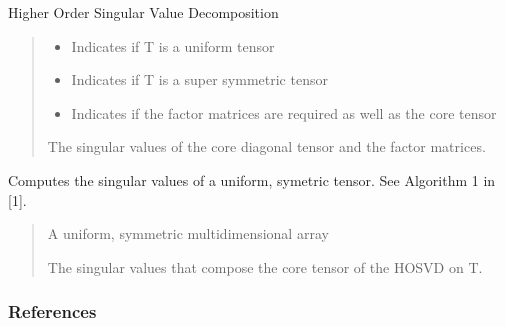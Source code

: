 \documentclass[letterpaper,10pt,english]{sphinxmanual}
\begin{document}
\begin{fulllineitems}
\label{\detokenize{HAT:HAT.multilinalg.hosvd}}
\pysigstartsignatures
{}
\pysigstopsignatures
\sphinxAtStartPar
Higher Order Singular Value Decomposition
\begin{quote}\begin{description}
\begin{itemize}
\item {} 
\sphinxAtStartPar
{} \textendash{} Indicates if T is a uniform tensor

\item {} 
\sphinxAtStartPar
{} \textendash{} Indicates if T is a super symmetric tensor

\item {} 
\sphinxAtStartPar
{} \textendash{} Indicates if the factor matrices are required as well as the core tensor

\end{itemize}

\sphinxAtStartPar
The singular values of the core diagonal tensor and the factor matrices.

\end{description}\end{quote}

\end{fulllineitems}


\begin{fulllineitems}
\label{\detokenize{HAT:HAT.multilinalg.supersymHosvd}}
\pysigstartsignatures
{}
\pysigstopsignatures
\sphinxAtStartPar
Computes the singular values of a uniform, symetric tensor. See Algorithm 1 in {[}1{]}.
\begin{quote}\begin{description}
\sphinxAtStartPar
{} \textendash{} A uniform, symmetric multidimensional array

\sphinxAtStartPar
The singular values that compose the core tensor of the HOSVD on T.

\end{description}\end{quote}
\subsubsection*{References}

\end{fulllineitems}
\end{document}
